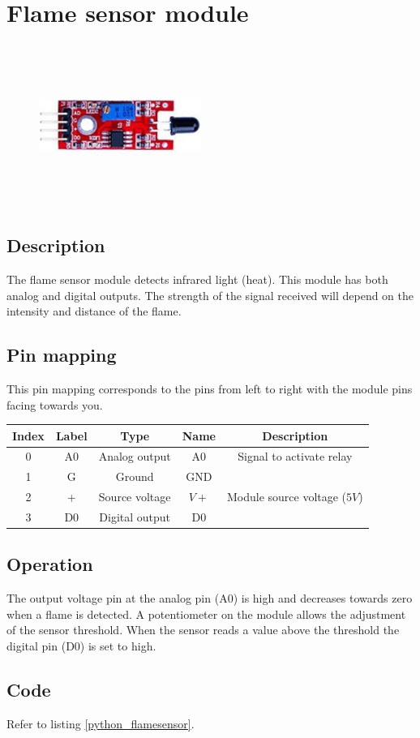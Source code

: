 \section{Flame sensor module}
\begin{figure}[H]
    \centering
    \includegraphics[angle=0, keepaspectratio=true, scale=1, width=200px, height=200px]{images/flame_sensor.jpg}
\end{figure}
\subsection*{Description}
The flame sensor module detects infrared light (heat). This module has both analog and digital outputs. The strength of the signal received will depend on the intensity and distance of the flame.
\subsection*{Pin mapping}
This pin mapping corresponds to the pins from left to right with the module pins facing towards you.
\begin{table}[H]
    \centering
    \begin{tabular}{|c|c|c|c|c|}
    \hline
    Index &Label &Type &Name &Description\\ \hline
    0 &A0 &Analog output &A0 &Signal to activate relay \\ \hline
    1 &G &Ground &GND &\\ \hline
    2 &+ &Source voltage &$V+$ &Module source voltage ($5V$)\\ \hline
    3 &D0 &Digital output &D0 &\\ \hline
    \end{tabular}
\end{table}
\subsection*{Operation}
The output voltage pin at the analog pin (A0) is high and decreases towards zero when a flame is detected. A potentiometer on the module allows the adjustment of the sensor threshold. When the sensor reads a value above the threshold the digital pin (D0) is set to high.
\subsection*{Code}
Refer to listing \ref{python_flamesensor}.
%